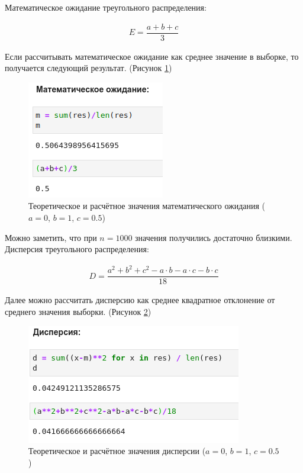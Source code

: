 \documentclass[14pt,fleqn]{extarticle}
\begin{document}
	Математическое ожидание треугольного распределения:
	\begin{ceqn}
	\begin{align*}
		E = \dfrac{a + b + c}{3}
	\end{align*}
	\end{ceqn}
	\newpage
	Если рассчитывать математическое ожидание как среднее значение в выборке, то получается следующий результат. (Рисунок \ref{fig:triangle_inverse_function_method_math})
	\begin{figure}[h]
		\centering \includegraphics[scale=0.7]{triangle_inverse_function_method_math}
		\caption{Теоретическое и расчётное значения математического ожидания ($a = 0$, $b = 1$, $c = 0.5$)}
		\label{fig:triangle_inverse_function_method_math}
	\end{figure}
	
	Можно заметить, что при $n = 1000$ значения получились достаточно близкими.\\
	Дисперсия треугольного распределения:
	\begin{ceqn}
		\begin{align*}
			D = \dfrac{a^2 + b^2 +c^2 - a \cdot b - a \cdot c - b \cdot c}{18}
		\end{align*}
	\end{ceqn}
	Далее можно рассчитать дисперсию как среднее квадратное отклонение от среднего значения выборки. (Рисунок \ref{fig:triangle_inverse_function_method_var})
	\begin{figure}[h]
		\centering \includegraphics[scale=0.7]{triangle_inverse_function_method_var}
		\caption{Теоретическое и расчётное значения дисперсии ($a = 0$, $b = 1$, $c = 0.5$)}
		\label{fig:triangle_inverse_function_method_var}
	\end{figure}
	
\end{document}
